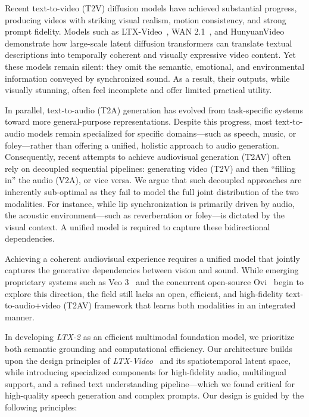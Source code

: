 \documentclass{article}
\begin{document}
Recent text-to-video (T2V) diffusion models have achieved substantial progress, producing videos with striking visual realism, motion consistency, and strong prompt fidelity. Models such as LTX-Video~\cite{hacohen2024ltx}, WAN 2.1~\cite{wang2025wan}, and HunyuanVideo~\cite{kong2024hunyuanvideo} demonstrate how large-scale latent diffusion transformers can translate textual descriptions into temporally coherent and visually expressive video content. Yet these models remain silent: they omit the semantic, emotional, and environmental information conveyed by synchronized sound. As a result, their outputs, while visually stunning, often feel incomplete and offer limited practical utility.

In parallel, text-to-audio (T2A) generation has evolved from task-specific systems toward more general-purpose representations. 
Despite this progress, most text-to-audio models remain specialized for specific domains—such as speech, music, or foley—rather than offering a unified, holistic approach to audio generation.
Consequently, recent attempts to achieve audiovisual generation (T2AV) often rely on decoupled sequential pipelines: generating video (T2V) and then ``filling in'' the audio (V2A), or vice versa. We argue that such decoupled approaches are inherently sub-optimal as they fail to model the full joint distribution of the two modalities. For instance, while lip synchronization is primarily driven by audio, the acoustic environment---such as reverberation or foley---is dictated by the visual context. A unified model is required to capture these bidirectional dependencies.

Achieving a coherent audiovisual experience requires a unified model that jointly captures the generative dependencies between vision and sound. While emerging proprietary systems such as Veo 3~\cite{veo32025} and the concurrent open-source Ovi~\cite{ovi2025} begin to explore this direction, the field still lacks an open, efficient, and high-fidelity text-to-audio+video (T2AV) framework that learns both modalities in an integrated manner.

In developing \textit{LTX-2} as an efficient multimodal foundation model, we prioritize both semantic grounding and computational efficiency. Our architecture builds upon the design principles of \textit{LTX-Video}~\cite{hacohen2024ltx} and its spatiotemporal latent space, while introducing specialized components for high-fidelity audio, multilingual support, and a refined text understanding pipeline---which we found critical for high-quality speech generation and complex prompts. Our design is guided by the following principles:
\end{document}
